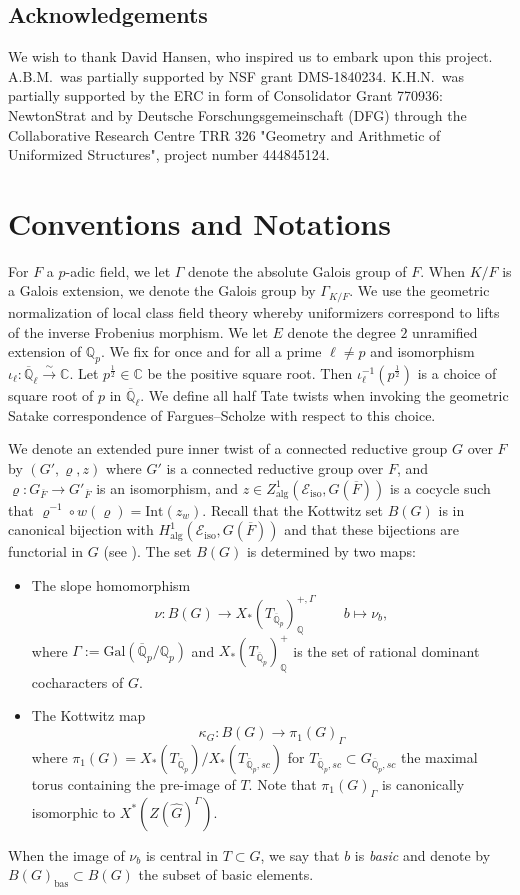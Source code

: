 \documentclass[reqno,11pt]{amsart}
\theoremstyle{remark}
\newcommand{\C}{\mathbb{C}}
\newcommand{\mc}{\mathcal}
\newcommand{\Q}{\mathbb{Q}}
\newcommand{\Int}{\mathrm{Int}}
\newcommand{\ov}{\overline}
\newcommand{\bas}{\mathrm{bas}}
\newcommand{\iso}{\mathrm{iso}}
\newcommand{\alg}{\mathrm{alg}}
\begin{document}
\subsection*{Acknowledgements}
We wish to thank David Hansen, who inspired us to embark upon this project. A.B.M.~was partially supported by NSF grant DMS-1840234. K.H.N.~was partially supported by the ERC in form of Consolidator Grant 770936: NewtonStrat and by Deutsche Forschungsgemeinschaft (DFG) through the Collaborative Research Centre TRR 326 "Geometry and Arithmetic of Uniformized Structures", project number 444845124.

\tableofcontents
\section*{Conventions and Notations}
For $F$ a $p$-adic field, we let $\Gamma$ denote the absolute Galois group of $F$. When $K/F$ is a Galois extension, we denote the Galois group by $\Gamma_{K/F}$. We use the geometric normalization of local class field theory whereby uniformizers correspond to lifts of the inverse Frobenius morphism.  We let $E$ denote the degree $2$ unramified extension of $\Q_p$. We fix for once and for all a prime $\ell \neq p$ and isomorphism $\iota_{\ell}: \ov{\Q}_{\ell} \xrightarrow{\sim} \C$. Let $p^{\frac{1}{2}} \in \C$ be the positive square root. Then $\iota_{\ell}^{-1}(p^{\frac{1}{2}})$ is a choice of square root of $p$ in $\ov{\Q}_{\ell}$. We define all half Tate twists when invoking the geometric Satake correspondence of Fargues--Scholze \cite[Chapter~VII]{FS} with respect to this choice. 

We denote an extended pure inner twist of a connected reductive group $G$ over $F$ by $(G', \varrho, z)$ where $G'$ is a connected reductive group over $F$, and $\varrho: G_{\ov{F}} \to G'_{\ov{F}}$ is an isomorphism, and $z \in Z^1_{\alg}(\mc{E}_{\iso}, G(\ov{F}))$ is a cocycle such that $\varrho^{-1} \circ w(\varrho) = \Int(z_w)$. Recall that the Kottwitz set $B(G)$ is in canonical bijection with $H^1_{\alg}(\mc{E}_{\iso}, G(\ov{F}))$ and that these bijections are functorial in $G$ (see \cite[Appendix B]{KottwitzIsocrystals2}). The set $B(G)$ is determined by two maps:
\begin{itemize}
    \item The slope homomorphism
    \[ \nu: B(G) \rightarrow X_*(T_{\overline{\mathbb{Q}}_{p}})^{+,\Gamma}_{\mathbb{Q}} \quad \quad b \mapsto \nu_{b}, \]
    where $\Gamma := \mathrm{Gal}(\overline{\mathbb{Q}}_{p}/\mathbb{Q}_{p})$ and 
    $X_*(T_{\overline{\mathbb{Q}}_{p}})_{\mathbb{Q}}^{+}$ is the set of rational dominant cocharacters of $G$. 
    \item The Kottwitz map
    \[ \kappa_G: B(G) \rightarrow \pi_{1}(G)_{\Gamma} \]
    where $\pi_1(G) = X_*(T_{\bar{\mathbb{Q}}_{p}})/X_*(T_{\bar{\mathbb{Q}}_{p},sc})$ for $T_{\bar{\mathbb{Q}}_{p},sc} \subset G_{\ov{\Q}_{p}, sc}$ the maximal torus containing the pre-image of $T$. Note that $\pi_1(G)_{\Gamma}$ is canonically isomorphic to $X^*(Z(\widehat{G})^{\Gamma})$.
\end{itemize}
When the image of $\nu_b$ is central in $T \subset G$, we say that $b$ is \emph{basic} and denote by $B(G)_{\bas} \subset B(G)$ the subset of basic elements.
\end{document}
